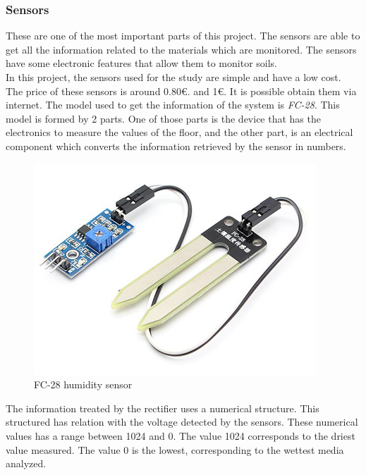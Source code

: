 \subsubsection{Sensors}

These are one of the most important parts of this project. The sensors are able to get all the information related to the materials which are monitored. The sensors have some electronic features that allow them to monitor soils.\\

In this project, the sensors used for the study are simple and have a low cost. The price of these sensors is around 0.80\euro . and 1\euro . It is possible obtain them via internet. The model used to get the information of the system is \textit{FC-28}. This model is formed by 2 parts. One of those parts is the device that has the electronics to measure the values of the floor, and the other part, is an electrical component which converts the information retrieved by the sensor in numbers.\\

\begin{figure}[H]
\begin{centering}
\includegraphics[scale=0.8]{IMGS/FC-28.png}
\caption{FC-28 humidity sensor \label{FC28}}
\end{centering}
\end{figure}

The information treated by the rectifier uses a numerical structure. This structured has relation with the voltage detected by the sensors. These numerical values has a range between 1024 and 0. The value 1024 corresponds to the driest value measured. The value 0 is the lowest, corresponding to the wettest media analyzed.\\

